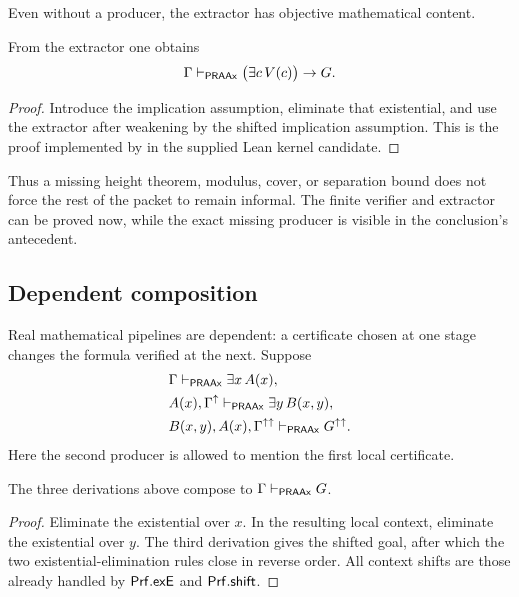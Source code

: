Even without a producer, the extractor has objective mathematical content.

\begin{theorem}
\label{thm:conditional}
From the extractor one obtains
\[
   \Gamma\mathrel{\vdash_{\mathsf{PRAAx}}}
   \bigl(\exists c\,V(c)\bigr)\to G.
\]
\end{theorem}

\begin{proof}
Introduce the implication assumption, eliminate that existential, and use the
extractor after weakening by the shifted implication assumption.  This is the
proof implemented by  in the supplied Lean kernel
candidate.
\end{proof}

Thus a missing height theorem, modulus, cover, or separation bound does not
force the rest of the packet to remain informal.  The finite verifier and
extractor can be proved now, while the exact missing producer is visible in the
conclusion's antecedent.

\subsection{Dependent composition}

Real mathematical pipelines are dependent: a certificate chosen at one stage
changes the formula verified at the next.  Suppose
\[
\begin{aligned}
  &\Gamma\mathrel{\vdash_{\mathsf{PRAAx}}}\exists x\,A(x),\\
  &A(x),\Gamma^{\mathord{\uparrow}}\mathrel{\vdash_{\mathsf{PRAAx}}}\exists y\,B(x,y),\\
  &B(x,y),A(x),\Gamma^{\mathord{\uparrow}\mathord{\uparrow}}\mathrel{\vdash_{\mathsf{PRAAx}}} G^{\mathord{\uparrow}\mathord{\uparrow}}.
\end{aligned}
\]
Here the second producer is allowed to mention the first local certificate.

\begin{theorem}
\label{thm:dependent-seal}
The three derivations above compose to \(\Gamma\mathrel{\vdash_{\mathsf{PRAAx}}} G\).
\end{theorem}

\begin{proof}
Eliminate the existential over \(x\).  In the resulting local context,
eliminate the existential over \(y\).  The third derivation gives the shifted
goal, after which the two existential-elimination rules close in reverse
order.  All context shifts are those already handled by \(\mathsf{Prf}.\mathsf{exE}\)
and \(\mathsf{Prf}.\mathsf{shift}\).
\end{proof}

